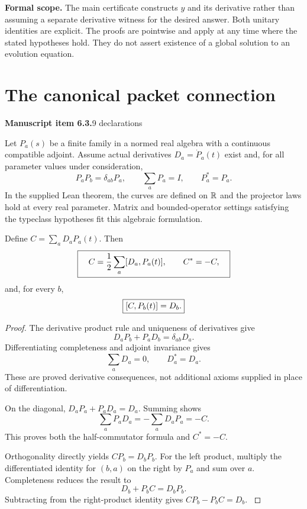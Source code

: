 \textbf{Formal scope.} The main certificate constructs $y$ and its derivative rather than assuming a separate derivative witness for the desired answer. Both unitary identities are explicit. The proofs are pointwise and apply at any time where the stated hypotheses hold. They do not assert existence of a global solution to an evolution equation.





\section{The canonical packet connection}\label{supp2:section:004}
\textbf{Manuscript item 6.3.}\quad {}\hfill 9 declarations

Let $P_a(s)$ be a finite family in a normed real algebra with a continuous compatible adjoint. Assume actual derivatives $D_a=\dot P_a(t)$ exist and, for all parameter values under consideration,
\[
 P_aP_b=\delta_{ab}P_a,\qquad \sum_aP_a=I,\qquad P_a^*=P_a.
\]
In the supplied Lean theorem, the curves are defined on $\mathbb R$ and the projector laws hold at every real parameter. Matrix and bounded-operator settings satisfying the typeclass hypotheses fit this algebraic formulation.

\begin{statement}\label{supp2:statement:004}
Define $C=\sum_aD_aP_a(t)$. Then
\[
 \boxed{\quad C=\frac12\sum_a[D_a,P_a(t)],\qquad C^*=-C,\quad}
\]
and, for every $b$,
\[
 \boxed{[C,P_b(t)]=D_b.}
\]
\end{statement}

\begin{proof}\label{supp2:proof:004}
The derivative product rule and uniqueness of derivatives give
\[
 D_aP_b+P_aD_b=\delta_{ab}D_a.
\]
Differentiating completeness and adjoint invariance gives
\[
 \sum_aD_a=0,\qquad D_a^*=D_a.
\]
These are proved derivative consequences, not additional axioms supplied in place of differentiation.

On the diagonal, $D_aP_a+P_aD_a=D_a$. Summing shows
\[
 \sum_aP_aD_a=-\sum_aD_aP_a=-C.
\]
This proves both the half-commutator formula and $C^*=-C$.

Orthogonality directly yields $CP_b=D_bP_b$. For the left product, multiply the differentiated identity for $(b,a)$ on the right by $P_a$ and sum over $a$. Completeness reduces the result to
\[
 D_b+P_bC=D_bP_b.
\]
Subtracting from the right-product identity gives $CP_b-P_bC=D_b$.
\label{supp2:proof:004:end}\end{proof}

